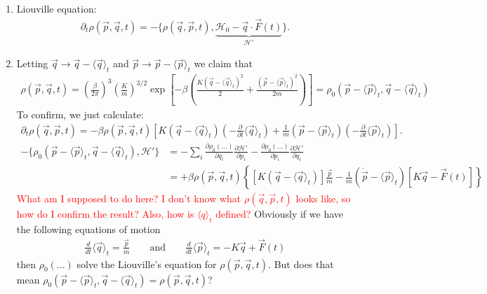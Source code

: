 \documentclass{article}
\theoremstyle{definition}
\newcommand{\p}{\partial}
\newcommand{\ham}{\mathcal{H}}
\newcommand{\be}{\beta}
\newcommand{\f}[2]{\frac{#1}{#2}}
\newcommand{\lp}{\left(}
\newcommand{\rp}{\right)}
\newcommand{\lb}{\left[}
\newcommand{\rb}{\right]}
\newcommand{\lc}{\left\{}
\newcommand{\rc}{\right\}}
\begin{document}
\begin{enumerate}[label=(\alph*)]
	\item Liouville equation:
	\begin{align*}
	\p_t \rho(\vec{p},\vec{q}, t) = -\{\rho(\vec{q},\vec{p},t), \underbrace{\ham_0 - \vec{q}\cdot \vec{F}(t)}_{\ham'}\}.
	\end{align*}
	
	
	\item Letting $\vec{q} \to \vec{q} - \langle \vec{q} \rangle_t$ and $\vec{p} \to \vec{p} - \langle \vec{p}\rangle_t$ we claim that
	\begin{align*}
	\rho(\vec{p}, \vec{q},t) = {\lp \f{\be}{2\pi} \rp^3 \lp \f{K}{m} \rp^{3/2}} \exp\lb -\be\lp \f{K(\vec{q} - \langle \vec{q} \rangle_t)^2}{2} + \f{(\vec{p} - \langle \vec{p}\rangle_t)^2}{2m} \rp \rb = \rho_0(\vec{p} - \langle \vec{p}\rangle_t , \vec{q} - \langle \vec{q}\rangle_t)
	\end{align*}
	To confirm, we just calculate:
	\begin{align*}
	\p_t \rho(\vec{q},\vec{p},t) = -\be \rho(\vec{p},\vec{q},t) \lb K(\vec{q} - \langle \vec{q} \rangle_t )\lp - \f{\p}{\p t} \langle \vec{q}\rangle_t\rp + \f{1}{m}(\vec{p} - \langle \vec{p} \rangle_t)\lp - \f{\p}{\p t} \langle \vec{p} \rangle_t \rp \rb.
	\end{align*}
	\begin{align*}
	-\{\rho_0(\vec{p} - \langle \vec{p}\rangle_t , \vec{q} - \langle \vec{q}\rangle_t), \ham' \}
	&= -\sum_i \f{\p \rho_0(\dots)}{\p q_i}\f{\p \ham'}{\p p_i} - \f{\p \rho_0(\dots)}{\p p_i}\f{\p \ham'}{\p q_i}\\
	&= +\be \rho(\vec{p},\vec{q},t)\lc  \lb K(\vec{q} - \langle \vec{q}\rangle_t) \rb \f{\vec{p}}{m} -\f{1}{m}(\dot{\vec{p}} -  \langle \vec{p}\rangle_t)   \lb K\vec{q} -\vec{F}(t) \rb \rc
	\end{align*}
	\textcolor{red}{What am I supposed to do here? I don't know what $\rho(\vec{q},\vec{p},t)$ looks like, so how do I confirm the result? Also, how is $\langle q\rangle_t$ defined?} Obviously if we have the following equations of motion
	\begin{align*}
	\boxed{\f{d}{dt}\langle \vec{q} \rangle_t =  \f{\vec{p}}{m}} \quad\quad \text{and} \quad\quad \boxed{\f{d}{dt}\langle \vec{p} \rangle_t = - K\vec{q} + \vec{F}(t)}
	\end{align*}
	then $\rho_0(\dots)$ solve the Liouville's equation for $\rho(\vec{p},\vec{q},t)$. But does that mean $\rho_0(\vec{p} - \langle \vec{p}\rangle_t, \vec{q} - \langle \vec{q} \rangle_t) = \rho(\vec{p},\vec{q},t)$?
	

\end{enumerate}
\end{document}
